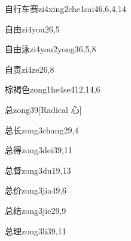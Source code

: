 \begin{entry}{自行车赛}{zi4xing2che1sai4}{6,6,4,14}
\end{entry}

\begin{entry}{自由}{zi4you2}{6,5}
\end{entry}

\begin{entry}{自由泳}{zi4you2yong3}{6,5,8}
\end{entry}

\begin{entry}{自责}{zi4ze2}{6,8}
\end{entry}

\begin{entry}{棕褐色}{zong1he4se4}{12,14,6}
\end{entry}

\begin{entry}{总}{zong3}{9}[Radical 心]
\end{entry}

\begin{entry}{总长}{zong3chang2}{9,4}
\end{entry}

\begin{entry}{总得}{zong3dei3}{9,11}
\end{entry}

\begin{entry}{总督}{zong3du1}{9,13}
\end{entry}

\begin{entry}{总价}{zong3jia4}{9,6}
\end{entry}

\begin{entry}{总结}{zong3jie2}{9,9}
\end{entry}

\begin{entry}{总理}{zong3li3}{9,11}
\end{entry}

